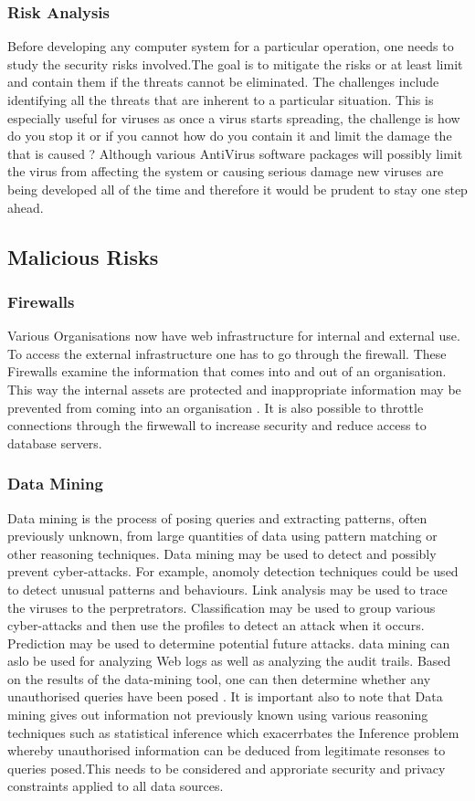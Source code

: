 \documentclass[11pt, twocolumn]{article}
\begin{document}
\subsubsection{Risk Analysis}
Before developing any computer system for a particular operation, one needs to study the security risks involved.The goal is to mitigate the risks or at least limit and contain them if the threats cannot be eliminated. The challenges include identifying all the threats that are inherent to a particular situation. This is especially useful for viruses as once a virus starts spreading, the challenge is how do you stop it or if you cannot how do you contain it and limit the damage the that is caused \cite{Thur}? Although various AntiVirus software  packages will possibly limit the virus from affecting the system or causing serious damage new viruses are being developed all of the time and therefore it would be prudent to stay one step ahead.

\subsection{Malicious Risks}
\subsubsection{Firewalls}
Various Organisations now have web infrastructure for internal and external use. To access the external infrastructure one has to go through the firewall. These Firewalls examine the information that comes into and out of an organisation. This way the internal assets are protected and inappropriate information may be prevented from coming into an organisation \cite{Thur}. It is also possible to throttle connections through the firwewall to increase security and reduce access to database servers.

\subsubsection{Data Mining}
Data mining is the process of posing queries and extracting patterns, often previously unknown, from large quantities of data using pattern matching or other reasoning techniques. Data mining may be used to detect and possibly prevent cyber-attacks. For example, anomoly detection techniques could be used to detect unusual patterns and behaviours. Link analysis may be used to trace the viruses to the perpretrators. Classification may be used to group various cyber-attacks and then use the profiles to detect an attack when it occurs. Prediction may be used to determine potential future attacks. data mining can aslo be used for analyzing Web logs as well as analyzing the audit trails. Based on the results of the data-mining tool, one can then determine whether any unauthorised queries have been posed \cite{Thur}.  It is important also to note that Data mining gives out information not previously known using various reasoning techniques such as statistical inference which exacerrbates the Inference problem whereby unauthorised information can be deduced from legitimate resonses to queries posed.This needs to be considered and approriate security and privacy constraints applied to all data sources.
\end{document}
